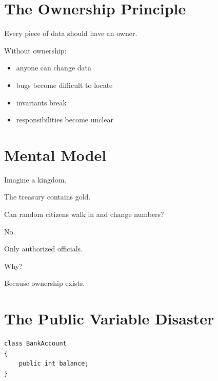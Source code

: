 \documentclass[11pt,a4paper]{book}
\begin{document}

\section{The Ownership Principle}

\begin{idea}

Every piece of data should have an owner.

\end{idea}

Without ownership:

\begin{itemize}
\item anyone can change data
\item bugs become difficult to locate
\item invariants break
\item responsibilities become unclear
\end{itemize}


\section{Mental Model}

\begin{mentalmodel}

Imagine a kingdom.

The treasury contains gold.

Can random citizens walk in and change numbers?

No.

Only authorized officials.

Why?

Because ownership exists.

\end{mentalmodel}


\section{The Public Variable Disaster}

\begin{verbatim}
class BankAccount
{
    public int balance;
}
\end{verbatim}
\end{document}
